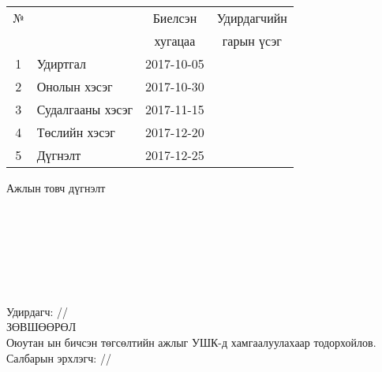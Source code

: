 \begin{titlepage}
\begin{center}
\begin{tabular}{|c|p{7cm}|c|c|}
	\hline
	№ & \makebox[7cm][c]{Хийж гүйцэтгэсэн ажил} & Биелсэн     & Удирдагчийн \\
	  &                    & хугацаа    & гарын үсэг \\ \hline
	1 & {Удиртгал}         & 2017-10-05 &  \\ \hline
	2 & {Онолын хэсэг}     & 2017-10-30 &  \\ \hline
	3 & {Судалгааны хэсэг} & 2017-11-15 &  \\ \hline
	4 & {Төслийн хэсэг}    & 2017-12-20 &  \\ \hline
	5 & {Дүгнэлт}          & 2017-12-25 &  \\ \hline
\end{tabular}

\vspace{1cm}
Ажлын товч дүгнэлт \\[0.5cm]
\dotfill \\[0.2cm]
\dotfill \\[0.2cm]
\dotfill \\[0.2cm]
\dotfill \\[0.2cm]
\dotfill \\[0.2cm]
\dotfill \\[0.2cm]
\dotfill \\[0.5cm]
Удирдагч: \makebox[3cm]{\dotfill} /\supname/ \\

\vspace{2cm}
ЗӨВШӨӨРӨЛ \\[0.5cm]
Оюутан \shortname ын бичсэн төгсөлтийн ажлыг УШК-д хамгаалуулахаар тодорхойлов.\\[0.5cm]
Салбарын эрхлэгч: \makebox[3cm]{\dotfill} /\chairname/
\end{center}

\end{titlepage}

\newpage

